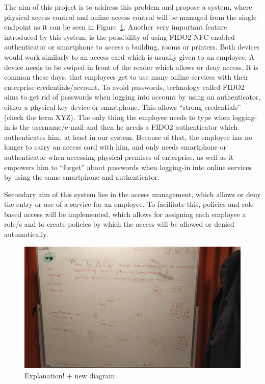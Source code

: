 The aim of this project is to address this problem and propose a system, where physical access control and online access control will be managed from the single endpoint as it can be seen in Figure~\ref{fig:IntroArchitecture}. Another very important feature introduced by this system, is the possibility of using FIDO2 NFC enabled authenticator or smartphone to access a building, rooms or printers. Both devices would work similarly to an access card which is usually given to an employee. A device needs to be swiped in front of the reader which allows or deny access. It is common these days, that employees get to use many online services with their enterprise credentials/account. To avoid passwords, technology called FIDO2 aims to get rid of passwords when logging into account by using an authenticator, either a physical key device or smartphone. This allows “strong credentials” (check the term XYZ). The only thing the employee needs to type when logging-in is the username/e-mail and then he needs a FIDO2 authenticator which authenticates him, at least in our system. Because of that, the employee has no longer to carry an access card with him, and only needs smartphone or authenticator when accessing physical premises of enterprise, as well as it empowers him to “forget” about passwords when logging-in into online services by using the same smartphone and authenticator.

Secondary aim of this system lies in the access management, which allows or deny the entry or use of a service for an employee. To facilitate this, policies and role-based access will be implemented, which allows for assigning each employee a role/s and to create policies by which the access will be allowed or denied automatically.

\begin{figure}[ht]
    \centering
    \includegraphics[width=.95\textwidth]{00images/IntroArchitecture}
    \caption{Explanation! + new diagram}
    \label{fig:IntroArchitecture}
\end{figure}
